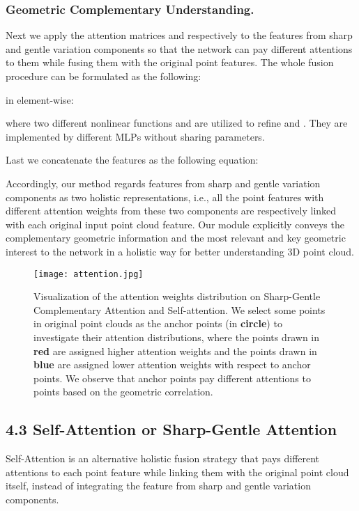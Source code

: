 \documentclass[letterpaper]{article} \usepackage{aaai21}  \usepackage{times}  \usepackage{helvet} \usepackage{courier}  \usepackage[hyphens]{url}  \usepackage{graphicx} \urlstyle{rm} \def\UrlFont{\rm}  \usepackage{natbib}  \usepackage{caption} \frenchspacing  \setlength{\pdfpagewidth}{8.5in}  \setlength{\pdfpageheight}{11in}  \usepackage{color}
\begin{document}
\subsubsection{Geometric Complementary Understanding.}
Next we apply the attention matrices  and  respectively to the features from sharp and gentle variation components so that the network can pay different attentions to them while fusing them with the original point features. The whole fusion procedure can be formulated as the following:


in element-wise:


where two different nonlinear functions  and  are utilized to refine  and . They are implemented by different MLPs without sharing parameters.

Last we concatenate the features as the following equation:


Accordingly, our method regards features from sharp and gentle variation components as two holistic representations, i.e., all the point features with different attention weights from these two components are respectively linked with each original input point cloud feature. Our module explicitly conveys the complementary geometric information and the most relevant and key geometric interest to the network in a holistic way for better understanding 3D point cloud.
\begin{figure}[t]
	\begin{center}
	\texttt{[image: attention.jpg]}
	\end{center}
	\caption{Visualization of the attention weights distribution on Sharp-Gentle Complementary Attention and Self-attention. We select some points in original point clouds as the anchor points (in \textbf{circle}) to investigate their attention distributions, where the points drawn in \textbf{red} are assigned higher attention weights and the points drawn in \textbf{blue} are assigned lower attention weights with respect to anchor points. We observe that anchor points pay different attentions to points based on the geometric correlation.}
	\label{ATT}
\end{figure}
\subsection{4.3 Self-Attention or Sharp-Gentle Attention}
Self-Attention is an alternative holistic fusion strategy that pays different attentions to each point feature while linking them with the original point cloud itself, instead of integrating the feature from sharp and gentle variation components. 
\end{document}
